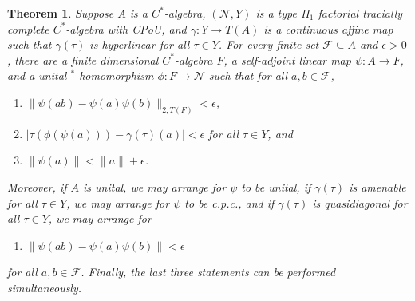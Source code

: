 \documentclass[a4paper,11pt]{amsart}
\newtheorem{theorem}{Theorem}
\theoremstyle{definition}
\numberwithin{equation}{section}
\numberwithin{theorem}{section}
\begin{document}
\begin{theorem}\label{thm:existence}
	Suppose $A$ is a $C^*$-algebra, $(\mathcal N, Y)$ is a type {\rm II}$_1$ factorial tracially complete $C^*$-algebra with CPoU, and $\gamma \colon Y \rightarrow T(A)$ is a continuous affine map such that $\gamma(\tau)$ is hyperlinear for all $\tau \in Y$.  For every finite set $\mathcal F \subseteq A$ and $\epsilon > 0$, there are a finite dimensional $C^*$-algebra $F$, a self-adjoint linear map $\psi \colon A \rightarrow F$, and a unital $^*$-homomorphism $\phi \colon F \rightarrow \mathcal N$ such that for all $a, b \in \mathcal F$,
	\begin{enumerate}
		\item $\|\psi(ab) - \psi(a)\psi(b) \|_{2, T(F)} < \epsilon$,
		\item $| \tau(\phi(\psi(a))) - \gamma(\tau)(a) | < \epsilon$ for all $\tau \in Y$, and
		\item $\|\psi(a)\| < \|a\| + \epsilon$.
	\end{enumerate}
Moreover, if $A$ is unital, we may arrange for $\psi$ to be unital, if $\gamma(\tau)$ is amenable for all $\tau \in Y$, we may arrange for $\psi$ to be c.p.c., and if $\gamma(\tau)$ is quasidiagonal for all $\tau \in Y$, we may arrange for
	\begin{enumerate}
		\item[\rm (i$'$)] $\|\psi(ab) - \psi(a)\psi(b)\| < \epsilon$
	\end{enumerate}
for all $a, b \in \mathcal F$.  Finally, the last three statements can be performed simultaneously.
\end{theorem}
\end{document}
